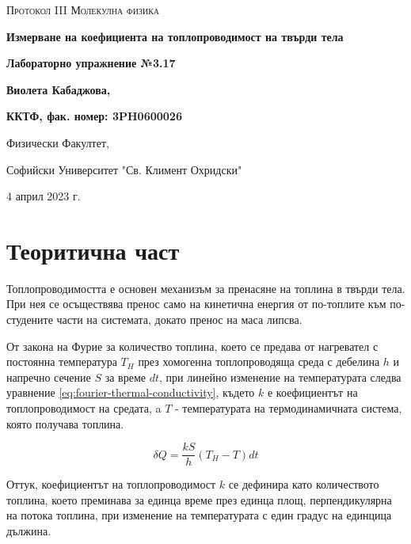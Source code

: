 \documentclass[12pt]{article}
\begin{document}
\begin{titlepage}
	\flushleft
	{\scshape\Large Протокол III \hspace{2cm} Молекулна физика\par}
	\vspace{4cm}
	{\huge\bfseries Измерване на коефициента на топлопроводимост на твърди тела\par}
	\vspace{1cm}
	{\LARGE\bfseries Лабораторно упражнение №3.17\par}
	\vspace{5cm}
    {\LARGE\bfseries Виолета Кабаджова, \par}
    {\large\bfseries ККТФ, фак. номер: 3PH0600026\par}
	\vspace{1cm}
	
	{\large Физически Факултет, 
	
	Софийски Университет "Св. Климент Охридски"
	
	4 април 2023 г.\par}
	
\end{titlepage}

\section{Теоритична част}\label{sec:theoretical-part}
Топлопроводимостта е основен механизъм за пренасяне на топлина в твърди тела. При нея се осъществява пренос само на кинетична енергия от по-топлите към по-студените части на системата, докато пренос на маса липсва.

От закона на Фурие за количество топлина, което се предава от нагревател с постоянна температура $T_H$ през хомогенна топлопроводяща среда с дебелина $h$ и напречно сечение $S$ за време $dt$, при линейно изменение на температурата следва уравнение \ref{eq:fourier-thermal-conductivity}, където $k$ е коефициентът на топлопроводимост на средата, a $T$ - температурата на термодинамичната система, която получава топлина.

\begin{equation}\label{eq:fourier-thermal-conductivity}
    \delta Q = \frac{kS}{h}(T_H - T)dt
\end{equation}

Оттук, коефициентът на топлопроводимост $k$ се дефинира като количеството топлина, което преминава за единца време през единца площ, перпендикулярна на потока топлина, при изменение на температурата с един градус на единцица дължина.
\end{document}
